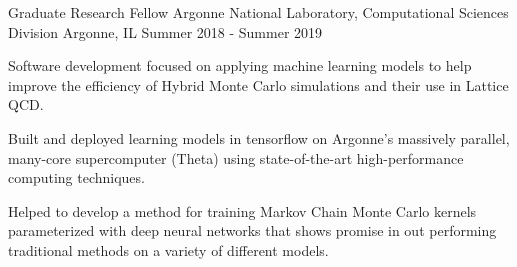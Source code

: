 \vspace{-1.75ex}

\begin{cventries}

  \cventry
  {Graduate Research Fellow} %
  {Argonne National Laboratory, Computational Sciences Division} %
  {Argonne, IL} %
  {Summer 2018 - Summer 2019} %
  {
      \begin{cvitems} %
          \item {Software development focused on applying machine learning
                  models to help improve the efficiency of Hybrid Monte Carlo 
                  simulations and their use in Lattice QCD.}
          \item {Built and deployed learning models in tensorflow on Argonne's
                  massively parallel, many-core supercomputer (Theta) using
                  state-of-the-art high-performance computing techniques.}
          \item {Helped to develop a method for training Markov Chain Monte
                  Carlo kernels parameterized with deep neural networks that
                  shows promise in out performing traditional methods on a
                  variety of different models.}
      \end{cvitems}
  }


\end{cventries}
